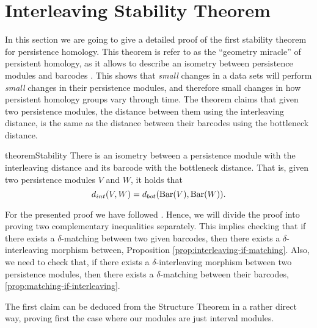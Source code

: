 \chapter{Interleaving Stability Theorem}
In this section we are going to give a detailed proof of the first stability theorem for persistence homology. This theorem is refer to as the ``geometry miracle'' of persistent homology, as it allows to describe an isometry between persistence modules and barcodes \cite{nanda}. This shows that {\it small} changes in a data sets will perform {\it small} changes in their persistence modules, and therefore small changes in how persistent homology groups vary through time. The theorem claims that given two persistence modules, the distance between them using the interleaving distance, is the same as the distance between their barcodes using the bottleneck distance.

\begin{restatable}[Stability]{theorem}{Stability} \cite[Theorem 2.2.8]{polterovich} \label{theorem:stability}
    There is an isometry between a persistence module with the interleaving distance and its barcode with the bottleneck distance. That is, given two persistence modules $ V $ and $ W $, it holds that
    $$ 
        d_{int} (V, W) = d_{bot} (\operatorname{Bar}(V), \operatorname{Bar}(W)).
    $$
\end{restatable}

For the presented proof we have followed \cite{polterovich}. Hence, we will divide the proof into proving two complementary inequalities separately. This implies checking that if there exists a $\delta$-matching between two given barcodes, then there exists a $\delta$-interleaving morphism between, Proposition \ref{prop:interleaving-if-matching}. Also, we need to check that, if there exists a $\delta$-interleaving morphism between two persistence modules, then there exists a $\delta$-matching between their barcodes, \ref{prop:matching-if-interleaving}.

The first claim can be deduced from the Structure Theorem in a rather direct way, proving first the case where our modules are just interval modules.


